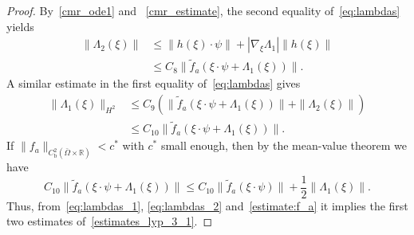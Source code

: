 \documentclass{elsarticle}
\begin{document}
\begin{proof}
By~\eqref{cmr_ode1} and ~\eqref{cmr_estimate}, the second equality of~\eqref{eq:lambdas} yields
\begin{equation} \label{eq:lambdas_2}
\begin{split}
\|\Lambda_2(\xi)\|&\leqslant \|h(\xi)\cdot \psi \| + |\nabla_{\xi}\Lambda_1|\|h(\xi)\|\\
&\leqslant C_8\|\tilde{f}_a(\xi\cdot\psi + \Lambda_1(\xi))\|.
\end{split}
\end{equation}
A similar estimate in the first equality of~\eqref{eq:lambdas} gives
\begin{equation} \label{eq:lambdas_1}
\begin{split}
\|\Lambda_1(\xi)\|_{H^2} &\leqslant C_9\left(\|\tilde{f}_a(\xi\cdot\psi + \Lambda_1(\xi))\| + \|\Lambda_2(\xi)\|\right)\\
	&\leqslant C_{10}\|\tilde{f}_a(\xi\cdot\psi + \Lambda_1(\xi))\|.
\end{split}
\end{equation}
If $\|f_a\|_{C^2_{\mathrm{b}}(\bar{\Omega}\times\mathbb{R})}< c^{\ast}$ with $c^\ast$ small enough, then by the mean-value theorem we have
\begin{equation} \label{estimate:f_a}
C_{10}\|\tilde{f}_a(\xi\cdot\psi + \Lambda_1(\xi))\|\leqslant C_{10}\|\tilde{f}_a(\xi\cdot\psi)\| +\frac{1}{2}\|\Lambda_1(\xi)\|.
\end{equation}
Thus, from~\eqref{eq:lambdas_1}, \eqref{eq:lambdas_2} and~\eqref{estimate:f_a} it implies the first two estimates of~\eqref{estimates_lyp_3_1}.


\end{proof}
\end{document}
